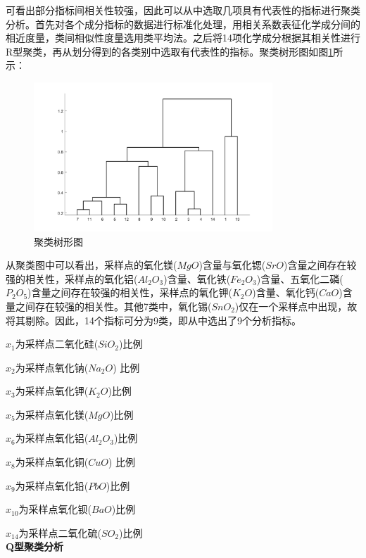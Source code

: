 \documentclass{my_paper}
\begin{document}
可看出部分指标间相关性较强，因此可以从中选取几项具有代表性的指标进行聚类分析。首先对各个成分指标的数据进行标准化处理，用相关系数表征化学成分间的相近度量，类间相似性度量选用类平均法。之后将14项化学成分根据其相关性进行R型聚类，再从划分得到的各类别中选取有代表性的指标。聚类树形图如图\ref{R型聚类图}所示：\\
\begin{figure}[H]
    \centering
    \includegraphics[width=0.8\textwidth]{R型聚类图.jpg}
    \caption{聚类树形图}
    \label{R型聚类图}
\end{figure}
从聚类图中可以看出，采样点的氧化镁($MgO$)含量与氧化锶($SrO$)含量之间存在较强的相关性，采样点的氧化铝($Al_2O_3$)含量、氧化铁($Fe_2O_3$)含量、五氧化二磷($P_2O_5$)含量之间存在较强的相关性，采样点的氧化钾($K_2O$)含量、氧化钙($CaO$)含量之间存在较强的相关性。其他7类中，氧化锡($SnO_2$)仅在一个采样点中出现，故将其剔除。因此，14个指标可分为9类，即从中选出了9个分析指标。

$x_1$为采样点二氧化硅($SiO_2$)比例

$x_2$为采样点氧化钠($Na_2O$) 比例

$x_3$为采样点氧化钾($K_2O$)比例

$x_5$为采样点氧化镁($MgO$)比例

$x_6$为采样点氧化铝($Al_2O_3$)比例

$x_8$为采样点氧化铜($CuO$) 比例

$x_9$为采样点氧化铅($PbO$)比例

$x_{10}$为采样点氧化钡($BaO$)比例

$x_{14}$为采样点二氧化硫($SO_2$)比例\\


\textbf{Q型聚类分析}
\end{document}
